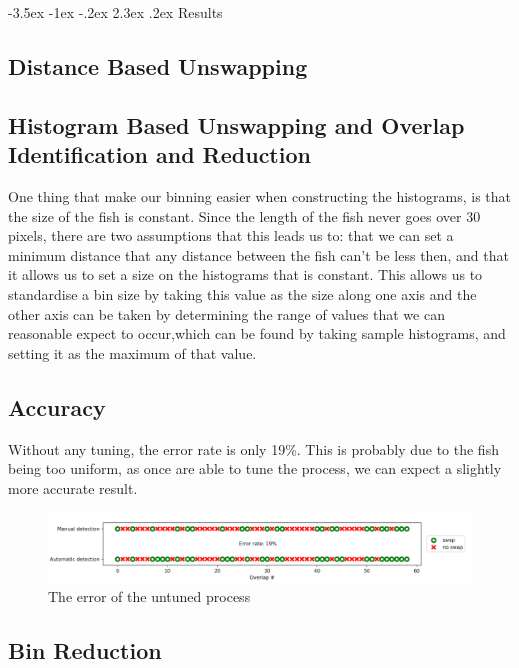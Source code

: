 \documentclass{article}
\makeatletter
\renewcommand\section{\clearpage\newpage\@startsection {section}{1}{\z@}%
	{-3.5ex \@plus -1ex \@minus -.2ex}%
	{2.3ex \@plus.2ex}%
	{\normalfont\Large\bfseries}}
\makeatother
\begin{document}
\section{Results}

\subsection{Distance Based Unswapping}

\subsection{Histogram Based Unswapping and Overlap Identification and Reduction}


One thing that make our binning easier when constructing the histograms, is that the size of the fish is constant. Since the length of the fish never goes over 30 pixels, there are two assumptions that this leads us to: that we can set a minimum distance that any distance between the fish can't be less then, and that it allows us to set a size on the histograms that is constant. This allows us to standardise a bin size by taking this value as the size along one axis and the other axis can be taken by determining the range of values that we can reasonable expect to occur,which can be found by taking sample histograms, and setting it as the maximum of that value.

\subsection{Accuracy}

Without any tuning, the error rate is only 19\%. This is probably due to the fish being too uniform, as once are able to tune the process, we can expect a slightly more accurate result.

\begin{figure}[H]
	\centering
	\includegraphics[width=\linewidth]{error}
	\caption{The error of the untuned process}
\end{figure}

\subsection{Bin Reduction}
\label{sec:binReduce}
\end{document}
